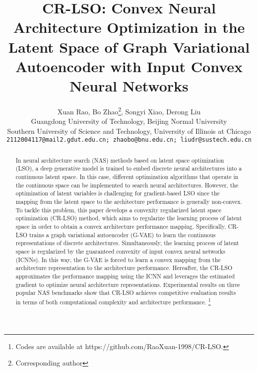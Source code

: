 \documentclass[10pt,twocolumn,letterpaper]{article}
\begin{document}
\title{CR-LSO: Convex Neural Architecture Optimization in the Latent Space of Graph Variational Autoencoder with Input Convex Neural Networks}

\author{Xuan Rao, Bo Zhao\footnote{Corresponding author}, Songyi Xiao, Derong Liu\\
Guangdong University of Technology, Beijing Normal University \\ Southern University of Science and Technology, University of Illinois at Chicago\\
{\tt\small 2112004117@mail2.gdut.edu.cn;  zhaobo@bnu.edu.cn;  liudr@sustech.edu.cn}
}
\maketitle

\begin{abstract}
In neural architecture search (NAS) methods based on latent space optimization (LSO), a deep generative model is trained to embed discrete neural architectures into a continuous latent space. In this case, different optimization algorithms that operate in the continuous space can be implemented to search neural architectures. However, the optimization of latent variables is challenging for gradient-based LSO since the mapping from the latent space to the architecture performance is generally non-convex. To tackle this problem, this paper develops a convexity regularized latent space optimization (CR-LSO) method, which aims to regularize the learning process of latent space in order to obtain a convex architecture performance mapping. Specifically, CR-LSO trains a graph variational autoencoder (G-VAE) to learn the continuous representations of discrete architectures. Simultaneously, the learning process of latent space is regularized by the guaranteed convexity of input convex neural networks (ICNNs). In this way, the G-VAE is forced to learn a convex mapping from the architecture representation to the architecture performance. Hereafter, the CR-LSO approximates the performance mapping using the ICNN and leverages the estimated gradient to optimize neural architecture representations. Experimental results on three popular NAS benchmarks show that CR-LSO achieves competitive evaluation results in terms of both computational complexity and architecture performance. \footnote{Codes are available at https://github.com/RaoXuan-1998/CR-LSO.}
\end{abstract}
\end{document}
